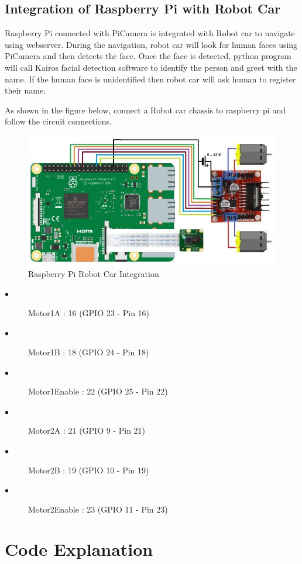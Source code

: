\documentclass[sigconf]{acmart}
\begin{document}
\subsection{Integration of Raspberry Pi with Robot Car}
Raspberry Pi connected with PiCamera is integrated with Robot car to navigate using webserver. During the navigation, robot car will look for human faces using PiCamera and then detects the face. Once the face is detected, python program will call Kairos facial detection software to identify the person and greet with the name. If the human face is unidentified then robot car will ask human to register their name.

As shown in the figure below, connect a Robot car chassis to raspberry pi and follow the circuit connections.

\begin{figure}[ht!]
  \includegraphics[width=\columnwidth]{images/RaspPi_Robot.jpg}
  \caption{Raspberry Pi Robot Car Integration}
\end{figure}

\begin{description}
    \item[$\bullet$] Motor1A : 16 (GPIO 23 - Pin 16)
    \item[$\bullet$] Motor1B : 18 (GPIO 24 - Pin 18)
    \item[$\bullet$] Motor1Enable : 22 (GPIO 25 - Pin 22)
    \item[$\bullet$] Motor2A : 21 (GPIO 9 - Pin 21)
    \item[$\bullet$] Motor2B : 19 (GPIO 10 - Pin 19)
    \item[$\bullet$] Motor2Enable : 23 (GPIO 11 - Pin 23)
\end{description}

\section{Code Explanation}
\end{document}
